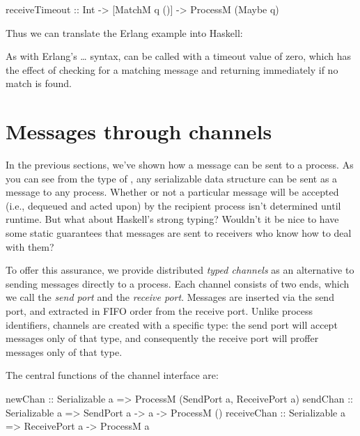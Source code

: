 \documentclass{sigplanconf}
\begin{document}
\begin{code}
receiveTimeout :: Int -> [MatchM q ()] -> 
														ProcessM (Maybe q)
\end{code}

\noindent
Thus we can translate the Erlang example into Haskell:


As with Erlang's \ldots{} syntax,  can be called with a timeout value of zero, which has the effect of checking for a matching message and returning immediately if no match is found.

\section{Messages through channels}
\label{s:Channels}

In the previous sections, we've shown how a message can be sent to a process. As you can see from the type of , any serializable data structure can be sent as a message to any process. Whether or not a particular message will be accepted (i.e., dequeued and acted upon) by the recipient process isn't determined until runtime. But what about Haskell's strong typing? Wouldn't it be nice to have some static guarantees that messages are sent to receivers who know how to deal with them?

To offer this assurance, we provide distributed {\em typed channels} as an alternative to sending messages directly to a process. Each channel consists of two ends, which we call the {\em send port} and the {\em receive port}. Messages are inserted via the send port, and extracted in FIFO order from the receive port. Unlike process identifiers, channels are created with a specific type: the send port will accept messages only of that type, and consequently the receive port will proffer messages only of that type.

The central functions of the channel interface are:
\par{\small
\begin{code}
newChan  :: Serializable a 
         => ProcessM (SendPort a, ReceivePort a)
sendChan :: Serializable a => SendPort a -> a -> ProcessM ()
receiveChan :: Serializable a => ReceivePort a -> ProcessM a
\end{code}}
\end{document}
